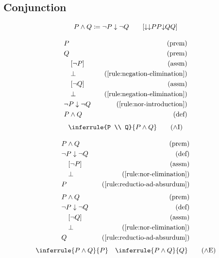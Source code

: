 \subsection{Conjunction}

\newcommand{\norwedge}[2]{{\nor}\norneg{#1}\norneg{#2}} %
\begin{notation}
    \[P \wedge Q \coloneqq \neg P \nor \neg Q \qquad [\norwedge{P}{Q}]\]
\end{notation}

\begin{align*}
    \premise{P}\\
    \premise{Q}\\
    \assumption[1]{\neg P}\\
    \byrule[1]{\bot}{\ref{rule:negation-elimination}} \\
    \assumption[1]{\neg Q}\\
    \byrule[1]{\bot}{\ref{rule:negation-elimination}}\\
    \byrule{\neg P \nor \neg Q}{\ref{rule:nor-introduction}}\\
    \bydefinition{P \wedge Q}
\end{align*}
\begin{equation}
    \inferrule{P \\ Q}{P \wedge Q}
    \tag{{$\wedge$}I}
    \label{rule:conjunction-introduction}
\end{equation}

\begin{align*}
    \premise{P \wedge Q}\\
    \bydefinition{\neg P \nor \neg Q}\\
    \assumption[1]{\neg P}\\
    \byrule[1]{\bot}{\ref{rule:nor-elimination}}\\
    \byrule{P}{\ref{rule:reductio-ad-absurdum}}
\end{align*}
\begin{align*}
    \premise{P \wedge Q}\\
    \bydefinition{\neg P \nor \neg Q}\\
    \assumption[1]{\neg Q}\\
    \byrule[1]{\bot}{\ref{rule:nor-elimination}}\\
    \byrule{Q}{\ref{rule:reductio-ad-absurdum}}
\end{align*}
\begin{equation}
    \inferrule{P \wedge Q}{P} \quad \inferrule{P \wedge Q}{Q}
    \tag{{$\wedge$}E}
    \label{rule:conjunction-elimination}
\end{equation}

